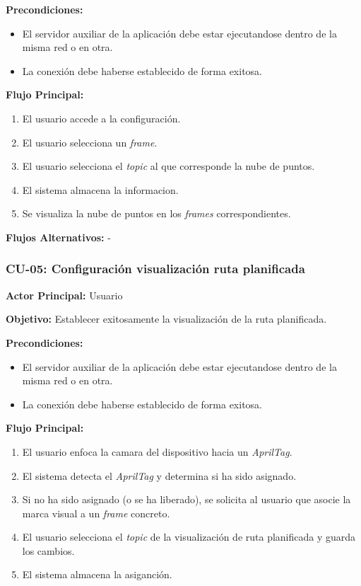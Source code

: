 \textbf{Precondiciones:}
\begin{itemize}
    \item El servidor auxiliar de la aplicación debe estar ejecutandose dentro de la misma red o en otra.
    \item La conexión debe haberse establecido de forma exitosa.
\end{itemize}

\textbf{Flujo Principal:}
\begin{enumerate}
    \item El usuario accede a la configuración.
    \item El usuario selecciona un \textit{frame}.
    \item El usuario selecciona el \textit{topic} al que corresponde la nube de puntos.
    \item El sistema almacena la informacion.
    \item Se visualiza la nube de puntos en los \textit{frames} correspondientes.
\end{enumerate}

\textbf{Flujos Alternativos:}
-

\subsubsection{CU-05: Configuración visualización ruta planificada}

\textbf{Actor Principal:} Usuario

\textbf{Objetivo:}
Establecer exitosamente la visualización de la ruta planificada.

\textbf{Precondiciones:}
\begin{itemize}
    \item El servidor auxiliar de la aplicación debe estar ejecutandose dentro de la misma red o en otra.
    \item La conexión debe haberse establecido de forma exitosa.
\end{itemize}

\textbf{Flujo Principal:}
\begin{enumerate}
    \item El usuario enfoca la camara del dispositivo hacia un \textit{AprilTag}.
    \item El sistema detecta el \textit{AprilTag} y determina si ha sido asignado.
    \item Si no ha sido asignado (o se ha liberado), se solicita al usuario que asocie la marca visual a un \textit{frame} concreto.
    \item El usuario selecciona el \textit{topic} de la visualización de ruta planificada y guarda los cambios.
    \item El sistema almacena la asiganción.
\end{enumerate}

